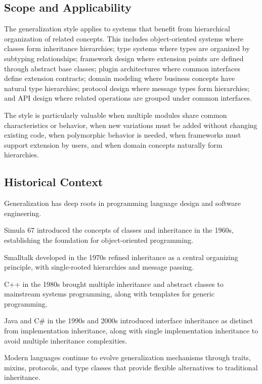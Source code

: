 \documentclass[11pt]{article}
\begin{document}
\subsection{Scope and Applicability}

The generalization style applies to systems that benefit from hierarchical organization of related concepts. This includes object-oriented systems where classes form inheritance hierarchies; type systems where types are organized by subtyping relationships; framework design where extension points are defined through abstract base classes; plugin architectures where common interfaces define extension contracts; domain modeling where business concepts have natural type hierarchies; protocol design where message types form hierarchies; and API design where related operations are grouped under common interfaces.

The style is particularly valuable when multiple modules share common characteristics or behavior, when new variations must be added without changing existing code, when polymorphic behavior is needed, when frameworks must support extension by users, and when domain concepts naturally form hierarchies.

\subsection{Historical Context}

Generalization has deep roots in programming language design and software engineering.

Simula 67 introduced the concepts of classes and inheritance in the 1960s, establishing the foundation for object-oriented programming.

Smalltalk developed in the 1970s refined inheritance as a central organizing principle, with single-rooted hierarchies and message passing.

C++ in the 1980s brought multiple inheritance and abstract classes to mainstream systems programming, along with templates for generic programming.

Java and C\# in the 1990s and 2000s introduced interface inheritance as distinct from implementation inheritance, along with single implementation inheritance to avoid multiple inheritance complexities.

Modern languages continue to evolve generalization mechanisms through traits, mixins, protocols, and type classes that provide flexible alternatives to traditional inheritance.
\end{document}
